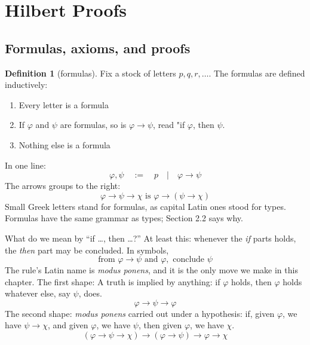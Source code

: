 \documentclass[a4paper, 11pt]{article}
\theoremstyle{definition}
\newtheorem{definition}{Definition}[section]
\begin{document}
\section{Hilbert Proofs}

\subsection{Formulas, axioms, and proofs}
\begin{definition}[formulas]
    Fix a stock of letters $p, q, r, \dots$. The formulas are defined inductively:
    \begin{enumerate}
        \item Every letter is a formula
        \item If $\varphi$ and $\psi$ are formulas, so is $\varphi \to \psi$, read "if $\varphi$, then $\psi$.
        \item Nothing else is a formula
    \end{enumerate}
    In one line: \[\varphi, \psi \quad := \quad p \quad | \quad \varphi \to \psi\]
    The arrows groups to the right: \[\varphi \to \psi \to \chi \text{ is } \varphi \to (\psi \to \chi)\]
    Small Greek letters stand for formulas, as capital Latin ones stood for types. Formulas have the same grammar as types; Section 2.2 says why.

    What do we mean by ``if \dots, then \dots?'' At least this: whenever the \textit{if} parts holds, the \textit{then} part may be concluded. In symbols, \[\text{from } \varphi \to \psi \text{ and } \varphi, \text{ conclude } \psi\]
    The rule's Latin name is \textit{modus ponens}, and it is the only move we make in this chapter.
    The first shape: A truth is implied by anything: if $\varphi$ holds, then $\varphi$ holds whatever else, say $\psi$, does.\[\varphi \to \psi \to \varphi\]
    The second shape: \textit{modus ponens} carried out under a hypothesis: if, given $\varphi$, we have $\psi \to \chi$, and given $\varphi$, we have $\psi$, then given $\varphi$, we have $\chi$. \[(\varphi \to \psi \to \chi) \to (\varphi \to \psi) \to \varphi \to \chi\]
\end{definition}
\end{document}
